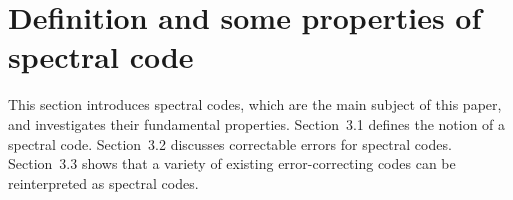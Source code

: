 \documentclass[12pt]{article}
\theoremstyle{definition} %
\theoremstyle{plain} %
\theoremstyle{remark} %
\theoremstyle{underline}
\begin{document}



\section{Definition and some properties of spectral code}
This section introduces spectral codes, which are the main subject of this paper, and investigates their fundamental properties.
Section~3.1 defines the notion of a spectral code.
Section~3.2 discusses correctable errors for spectral codes.
Section~3.3 shows that a variety of existing error-correcting codes can be reinterpreted as spectral codes.
\end{document}
